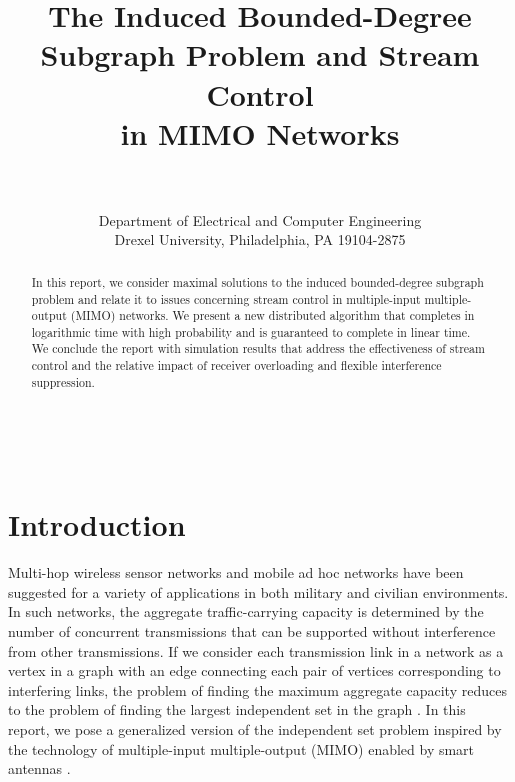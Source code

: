\documentclass[journal,12pt,onecolumn]{IEEEtran}
\begin{document}
\title{The Induced Bounded-Degree Subgraph Problem and 
Stream Control\\ in MIMO Networks}

\author{\\
\\
Department of Electrical and Computer Engineering\\
Drexel University, Philadelphia, PA 19104-2875
}

\maketitle

~\vskip 1in
\begin{abstract}
In this report, we consider maximal solutions to the induced
bounded-degree subgraph problem and relate it to issues
concerning stream control in multiple-input multiple-output (MIMO)
networks. We present a new distributed algorithm that completes in
logarithmic time with high probability and is guaranteed to complete
in linear time. We conclude the report with simulation results that
address the effectiveness of stream control and the relative impact of
receiver overloading and flexible interference suppression.
\end{abstract}

\IEEEpeerreviewmaketitle
\thispagestyle{empty}

\newpage
\section{Introduction}
\label{sec:intro}

Multi-hop wireless sensor networks and mobile ad hoc networks
have been suggested for a variety of applications in both military and
civilian environments. In such networks, the aggregate
traffic-carrying capacity is determined by the number of concurrent
transmissions that can be supported without interference from other
transmissions. If we consider each transmission link in a
network as a vertex in a graph with an edge connecting each pair of
vertices corresponding to interfering links, the problem of finding the maximum
aggregate capacity reduces to the problem of finding the largest
independent set in the graph \cite{Pel2000,BalBar2004}. In this
report, we pose a generalized version of the independent set problem
inspired by the technology of multiple-input multiple-output (MIMO)
enabled by smart antennas \cite{HayMoh2005}.
\end{document}
